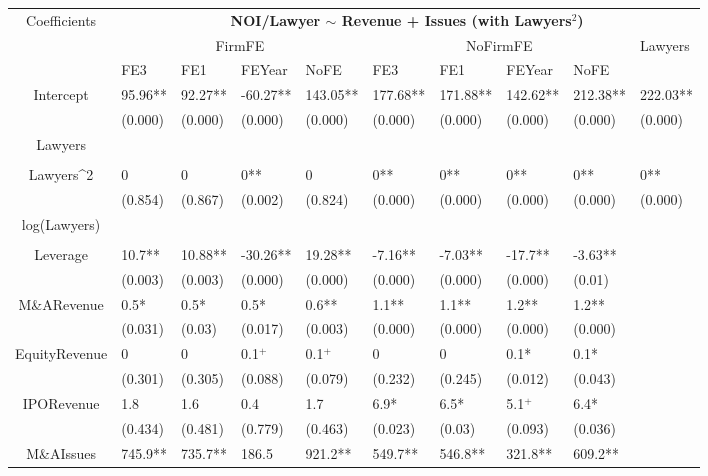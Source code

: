 \documentclass{article}
\begin{document}
\begin{table}[H]
\centering
\begin{tabular}{|clllllllll|}
\hline
\multirow{3}{*}{Coefficients} & \multicolumn{9}{c|}{\textbf{NOI/Lawyer $\sim$ Revenue + Issues (with Lawyers$^2$)}} \\
\cline{2-10}
& \multicolumn{4}{c}{FirmFE} & \multicolumn{4}{c}{NoFirmFE} & \multirow{2}{*}{Lawyers} \\
\cline{2-9}
& FE3 & FE1 & FEYear & NoFE & FE3 & FE1 & FEYear & NoFE &  \\
\hline
 
Intercept & 95.96** & 92.27** & -60.27** & 143.05** & 177.68** & 171.88** & 142.62** & 212.38** & 222.03** \\ 
   & (0.000) & (0.000) & (0.000) & (0.000) & (0.000) & (0.000) & (0.000) & (0.000) & (0.000) \\ 
  Lawyers &  &  &  &  &  &  &  &  &  \\ 
   &  &  &  &  &  &  &  &  &  \\ 
  Lawyers^2 & 0 & 0 & 0** & 0 & 0** & 0** & 0** & 0** & 0** \\ 
   & (0.854) & (0.867) & (0.002) & (0.824) & (0.000) & (0.000) & (0.000) & (0.000) & (0.000) \\ 
  log(Lawyers) &  &  &  &  &  &  &  &  &  \\ 
   &  &  &  &  &  &  &  &  &  \\ 
  Leverage & 10.7** & 10.88** & -30.26** & 19.28** & -7.16** & -7.03** & -17.7** & -3.63** &  \\ 
   & (0.003) & (0.003) & (0.000) & (0.000) & (0.000) & (0.000) & (0.000) & (0.01) &  \\ 
  M\&ARevenue & 0.5* & 0.5* & 0.5* & 0.6** & 1.1** & 1.1** & 1.2** & 1.2** &  \\ 
   & (0.031) & (0.03) & (0.017) & (0.003) & (0.000) & (0.000) & (0.000) & (0.000) &  \\ 
  EquityRevenue & 0 & 0 & 0.1$^{+}$ & 0.1$^{+}$ & 0 & 0 & 0.1* & 0.1* &  \\ 
   & (0.301) & (0.305) & (0.088) & (0.079) & (0.232) & (0.245) & (0.012) & (0.043) &  \\ 
  IPORevenue & 1.8 & 1.6 & 0.4 & 1.7 & 6.9* & 6.5* & 5.1$^{+}$ & 6.4* &  \\ 
   & (0.434) & (0.481) & (0.779) & (0.463) & (0.023) & (0.03) & (0.093) & (0.036) &  \\ 
  M\&AIssues & 745.9** & 735.7** & 186.5 & 921.2** & 549.7** & 546.8** & 321.8** & 609.2** &  \\ 

\end{tabular}
\end{table}
\end{document}
